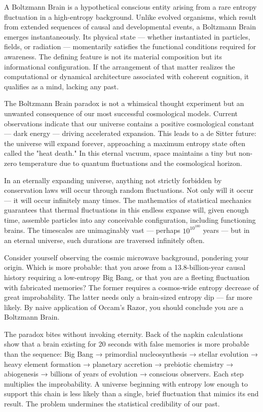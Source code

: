 A Boltzmann Brain is a hypothetical conscious entity arising from a rare entropy fluctuation in a high-entropy background. Unlike evolved organisms, which result from extended sequences of causal and developmental events, a Boltzmann Brain emerges instantaneously. Its physical state — whether instantiated in particles, fields, or radiation — momentarily satisfies the functional conditions required for awareness. The defining feature is not its material composition but its informational configuration. If the arrangement of that matter realizes the computational or dynamical architecture associated with coherent cognition, it qualifies as a mind, lacking any past.

The Boltzmann Brain paradox is not a whimsical thought experiment but an unwanted consequence of our most successful cosmological models. Current observations indicate that our universe contains a positive cosmological constant — dark energy — driving accelerated expansion. This leads to a de Sitter future: the universe will expand forever, approaching a maximum entropy state often called the "heat death." In this eternal vacuum, space maintains a tiny but non-zero temperature due to quantum fluctuations and the cosmological horizon.

In an eternally expanding universe, anything not strictly forbidden by conservation laws will occur through random fluctuations. Not only will it occur — it will occur infinitely many times. The mathematics of statistical mechanics guarantees that thermal fluctuations in this endless expanse will, given enough time, assemble particles into any conceivable configuration, including functioning brains. The timescales are unimaginably vast — perhaps $10^{10^{100}}$ years — but in an eternal universe, such durations are traversed infinitely often.

Consider yourself observing the cosmic microwave background, pondering your origin. Which is more probable: that you arose from a 13.8-billion-year causal history requiring a low-entropy Big Bang, or that you are a fleeting fluctuation with fabricated memories? The former requires a cosmos-wide entropy decrease of great improbability. The latter needs only a brain-sized entropy dip — far more likely. By naive application of Occam's Razor, you should conclude you are a Boltzmann Brain.

The paradox bites without invoking eternity. Back of the napkin calculations show that a brain existing for 20 seconds with false memories is more probable than the sequence: Big Bang → primordial nucleosynthesis → stellar evolution → heavy element formation → planetary accretion → prebiotic chemistry → abiogenesis → billions of years of evolution → conscious observers. Each step multiplies the improbability. A universe beginning with entropy low enough to support this chain is less likely than a single, brief fluctuation that mimics its end result. The problem undermines the statistical credibility of our past.


